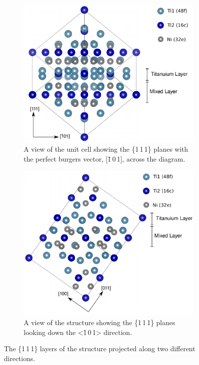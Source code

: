 \begin{figure}
\centering
\begin{subfigure}{0.65\textwidth}
\centering
\includegraphics[width=\textwidth]{Ti2Ni_111_down_211}
\caption{A view of the  unit cell showing the \{1\,1\,1\} planes with the perfect burgers vector, [\=1\,0\,1], across the diagram.\label{fig:slip_system_Ti2Ni}}
\end{subfigure}

\begin{subfigure}{0.65\textwidth}
\centering
\includegraphics[width=\textwidth]{Ti2Ni_111_down_101}
\caption{A view of the  structure showing the \{1\,1\,1\} planes looking down the <\=1\,0\,1> direction.\label{fig:Laves_phase_Ti2Ni_similarity}}
\end{subfigure}
\caption[The \{1\,1\,1\} planes of the  structure.]{The \{1\,1\,1\} layers of the  structure projected along two different directions.\label{fig:Ti2Ni_111_planes}}
\end{figure}

